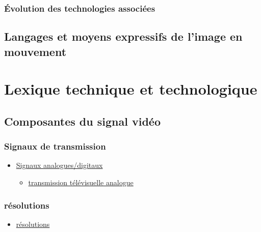 \documentclass[
]{book}
\providecommand{\tightlist}{%
  \setlength{\itemsep}{0pt}\setlength{\parskip}{0pt}}
\begin{document}
\hypertarget{evolution_historique_technologies}{%
\subsection{Évolution des technologies associées}\label{evolution_historique_technologies}}

\hypertarget{evolution_historique_language}{%
\section{Langages et moyens expressifs de l'image en mouvement}\label{evolution_historique_language}}

\hypertarget{lexique}{%
\chapter{Lexique technique et technologique}\label{lexique}}

\hypertarget{lexique_composantes}{%
\section{Composantes du signal vidéo}\label{lexique_composantes}}

\hypertarget{signaux-de-transmission}{%
\subsection{Signaux de transmission}\label{signaux-de-transmission}}

\begin{itemize}
\tightlist
\item
  \href{https://en.wikipedia.org/wiki/Video\#Analog_video}{Signaux analogues/digitaux}

  \begin{itemize}
  \tightlist
  \item
    \href{https://en.wikipedia.org/wiki/Analog_television}{transmission télévisuelle analogue}
  \end{itemize}
\end{itemize}

\hypertarget{ruxe9solutions}{%
\subsection{résolutions}\label{ruxe9solutions}}

\begin{itemize}
\tightlist
\item
  \href{https://en.wikipedia.org/wiki/Computer_display_standard\#/media/File:Vector_Video_Standards2.svg}{résolutions}
\end{itemize}
\end{document}
